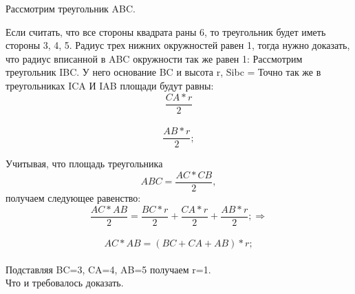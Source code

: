 \solutionSection

Рассмотрим треугольник ABC. 

Если считать, что все стороны квадрата раны 6, то треугольник будет иметь стороны 3, 4, 5. Радиус трех нижних окружностей равен 1, тогда нужно доказать, что радиус вписанной в ABC окружности так же равен 1: 
Рассмотрим треугольник IBC. У него основание BC и высота r, \Rightarrow Sibc =  
Точно так же в треугольниках ICA И IAB площади будут равны:
\begin{displaymath} 
\frac{CA*r}{2} 
\end{displaymath}\\
\begin{displaymath} 
\frac{AB*r}{2};
\end{displaymath}

Учитывая, что площадь треугольника \begin{displaymath}  ABC = \frac{AC*CB}{2}, \end{displaymath} получаем следующее равенство: 
\begin{displaymath}
\frac{AC*AB}{2} = \frac{BC*r}{2} + \frac{CA*r}{2} +  \frac{AB*r}{2}; \Rightarrow 
\end{displaymath}\\
\begin{displaymath}
AC*AB = (BC + CA + AB)*r;
\end{displaymath}\\

Подставляя BC=3, CA=4, AB=5 получаем r=1.\\

Что и требовалось доказать.